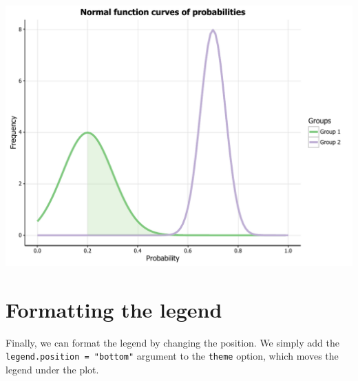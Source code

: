 \begin{Shaded}
\begin{Highlighting}[]
\StringTok{ }
\StringTok{      }\StringTok{ } \NormalTok{, } \NormalTok{)}
\StringTok{      }\NormalTok{y[x <}\StringTok{ } \NormalTok{|}\StringTok{ }\StringTok{ }\NormalTok{(} \NormalTok{+}\StringTok{ } \NormalTok{*}\StringTok{ }\NormalTok{)] <-}\StringTok{ }
\StringTok{      }
\NormalTok{\}}

\StringTok{ }\StringTok{ }\NormalTok{(}\NormalTok{, }\NormalTok{, }\NormalTok{)}
\end{Highlighting}
\end{Shaded}

\begin{center}\includegraphics[width=0.55\linewidth]{figures/function_17-1} \end{center}

\section{Formatting the legend}\label{formatting-the-legend-2}

Finally, we can format the legend by changing the position. We simply
add the \texttt{legend.position\ =\ "bottom"} argument to the
\texttt{theme} option, which moves the legend under the plot.

